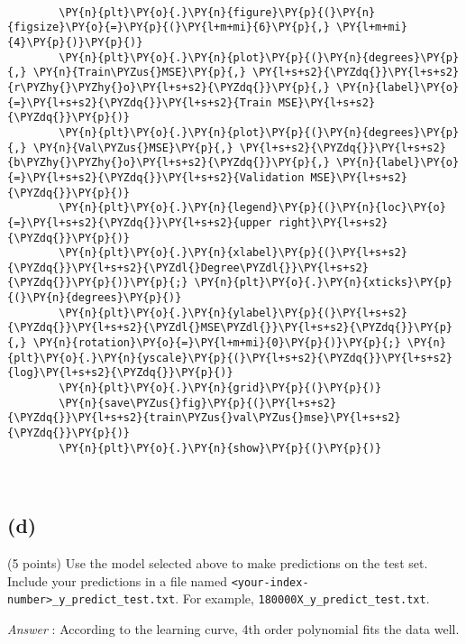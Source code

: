 \documentclass[a4paper,11pt]{article}%
\begin{document}
\begin{tcolorbox}[breakable, size=fbox, boxrule=1pt, pad at break*=1mm,colback=cellbackground, colframe=cellborder]
\begin{Verbatim}[commandchars=\\\{\}]
		
		\PY{n}{plt}\PY{o}{.}\PY{n}{figure}\PY{p}{(}\PY{n}{figsize}\PY{o}{=}\PY{p}{(}\PY{l+m+mi}{6}\PY{p}{,} \PY{l+m+mi}{4}\PY{p}{)}\PY{p}{)}
		\PY{n}{plt}\PY{o}{.}\PY{n}{plot}\PY{p}{(}\PY{n}{degrees}\PY{p}{,} \PY{n}{Train\PYZus{}MSE}\PY{p}{,} \PY{l+s+s2}{\PYZdq{}}\PY{l+s+s2}{r\PYZhy{}\PYZhy{}o}\PY{l+s+s2}{\PYZdq{}}\PY{p}{,} \PY{n}{label}\PY{o}{=}\PY{l+s+s2}{\PYZdq{}}\PY{l+s+s2}{Train MSE}\PY{l+s+s2}{\PYZdq{}}\PY{p}{)}
		\PY{n}{plt}\PY{o}{.}\PY{n}{plot}\PY{p}{(}\PY{n}{degrees}\PY{p}{,} \PY{n}{Val\PYZus{}MSE}\PY{p}{,} \PY{l+s+s2}{\PYZdq{}}\PY{l+s+s2}{b\PYZhy{}\PYZhy{}o}\PY{l+s+s2}{\PYZdq{}}\PY{p}{,} \PY{n}{label}\PY{o}{=}\PY{l+s+s2}{\PYZdq{}}\PY{l+s+s2}{Validation MSE}\PY{l+s+s2}{\PYZdq{}}\PY{p}{)}
		\PY{n}{plt}\PY{o}{.}\PY{n}{legend}\PY{p}{(}\PY{n}{loc}\PY{o}{=}\PY{l+s+s2}{\PYZdq{}}\PY{l+s+s2}{upper right}\PY{l+s+s2}{\PYZdq{}}\PY{p}{)}
		\PY{n}{plt}\PY{o}{.}\PY{n}{xlabel}\PY{p}{(}\PY{l+s+s2}{\PYZdq{}}\PY{l+s+s2}{\PYZdl{}Degree\PYZdl{}}\PY{l+s+s2}{\PYZdq{}}\PY{p}{)}\PY{p}{;} \PY{n}{plt}\PY{o}{.}\PY{n}{xticks}\PY{p}{(}\PY{n}{degrees}\PY{p}{)}
		\PY{n}{plt}\PY{o}{.}\PY{n}{ylabel}\PY{p}{(}\PY{l+s+s2}{\PYZdq{}}\PY{l+s+s2}{\PYZdl{}MSE\PYZdl{}}\PY{l+s+s2}{\PYZdq{}}\PY{p}{,} \PY{n}{rotation}\PY{o}{=}\PY{l+m+mi}{0}\PY{p}{)}\PY{p}{;} \PY{n}{plt}\PY{o}{.}\PY{n}{yscale}\PY{p}{(}\PY{l+s+s2}{\PYZdq{}}\PY{l+s+s2}{log}\PY{l+s+s2}{\PYZdq{}}\PY{p}{)}
		\PY{n}{plt}\PY{o}{.}\PY{n}{grid}\PY{p}{(}\PY{p}{)}
		\PY{n}{save\PYZus{}fig}\PY{p}{(}\PY{l+s+s2}{\PYZdq{}}\PY{l+s+s2}{train\PYZus{}val\PYZus{}mse}\PY{l+s+s2}{\PYZdq{}}\PY{p}{)}
		\PY{n}{plt}\PY{o}{.}\PY{n}{show}\PY{p}{(}\PY{p}{)}
	\end{Verbatim}
\end{tcolorbox}

\begin{center}
\end{center}
{ \hspace*{\fill} \\}

\hypertarget{d}{%
	\subsection{(d)}\label{d}}

(5 points) Use the model selected above to make predictions on the test
set. Include your predictions in a file named
\texttt{\textless{}your-index-number\textgreater{}\_y\_predict\_test.txt}.
For example, \texttt{180000X\_y\_predict\_test.txt}.

\emph{Answer} : According to the learning curve, 4th order polynomial
fits the data well.
\end{document}
